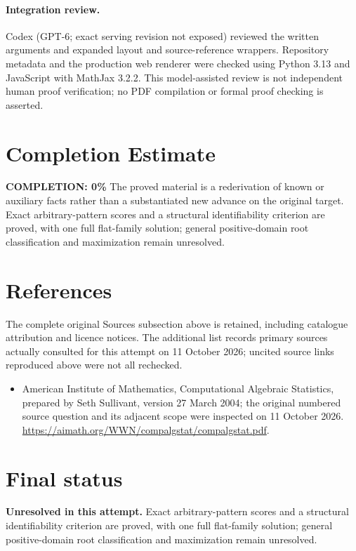 \documentclass[11pt]{article}
\begin{document}
\paragraph{Integration review.} Codex (GPT-6; exact serving revision not exposed) reviewed the written arguments and expanded layout and source-reference wrappers. Repository metadata and the production web renderer were checked using Python 3.13 and JavaScript with MathJax 3.2.2. This model-assisted review is not independent human proof verification; no PDF compilation or formal proof checking is asserted.

\section{Completion Estimate}
\noindent\textbf{COMPLETION: 0\%}
The proved material is a rederivation of known or auxiliary facts rather than a substantiated new advance on the original target. Exact arbitrary-pattern scores and a structural identifiability criterion are proved, with one full flat-family solution; general positive-domain root classification and maximization remain unresolved.
\section{References}
The complete original Sources subsection above is retained, including catalogue attribution and licence notices. The additional list records primary sources actually consulted for this attempt on 11 October 2026; uncited source links reproduced above were not all rechecked.
\begin{itemize}
\item American Institute of Mathematics, Computational Algebraic Statistics, prepared by Seth Sullivant, version 27 March 2004; the original numbered source question and its adjacent scope were inspected on 11 October 2026. \url{https://aimath.org/WWN/compalgstat/compalgstat.pdf}.
\end{itemize}
\section{Final status}
\textbf{Unresolved in this attempt.} Exact arbitrary-pattern scores and a structural identifiability criterion are proved, with one full flat-family solution; general positive-domain root classification and maximization remain unresolved.
\end{document}
